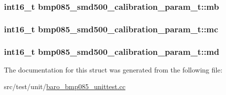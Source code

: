 \hypertarget{structbmp085__smd500__calibration__param__t_a86b6c6075ed0053f56b2306e644740de}{
\subsubsection[{mb}]{\setlength{\rightskip}{0pt plus 5cm}int16\+\_\+t bmp085\+\_\+smd500\+\_\+calibration\+\_\+param\+\_\+t\+::mb}}\label{structbmp085__smd500__calibration__param__t_a86b6c6075ed0053f56b2306e644740de}
\hypertarget{structbmp085__smd500__calibration__param__t_a3280e64a1a2370cee8ea610957320e3b}{
\subsubsection[{mc}]{\setlength{\rightskip}{0pt plus 5cm}int16\+\_\+t bmp085\+\_\+smd500\+\_\+calibration\+\_\+param\+\_\+t\+::mc}}\label{structbmp085__smd500__calibration__param__t_a3280e64a1a2370cee8ea610957320e3b}
\hypertarget{structbmp085__smd500__calibration__param__t_af43245743d7be419f4b82dee752b768e}{
\subsubsection[{md}]{\setlength{\rightskip}{0pt plus 5cm}int16\+\_\+t bmp085\+\_\+smd500\+\_\+calibration\+\_\+param\+\_\+t\+::md}}\label{structbmp085__smd500__calibration__param__t_af43245743d7be419f4b82dee752b768e}


The documentation for this struct was generated from the following file\+:\begin{DoxyCompactItemize}
\item 
src/test/unit/\hyperlink{baro__bmp085__unittest_8cc}{baro\+\_\+bmp085\+\_\+unittest.\+cc}\end{DoxyCompactItemize}
